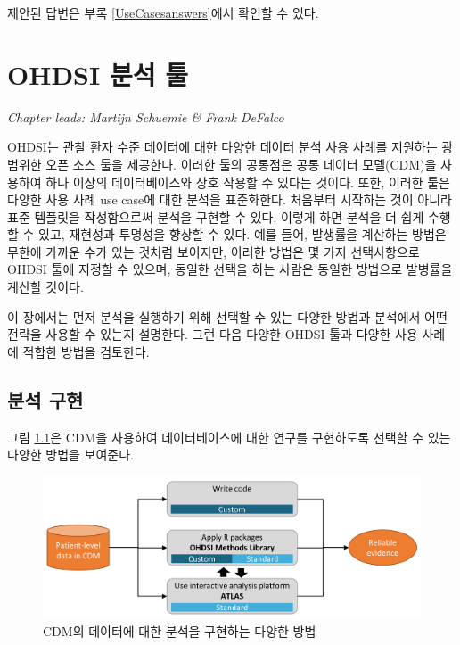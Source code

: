 \documentclass[10.5pt]{book}
\theoremstyle{definition}
\theoremstyle{definition}
\theoremstyle{definition}
\theoremstyle{remark}
\begin{document}
제안된 답변은 부록 \ref{UseCasesanswers}에서 확인할 수 있다.

\chapter{OHDSI 분석 툴}\label{OhdsiAnalyticsTools}

\emph{Chapter leads: Martijn Schuemie \& Frank DeFalco}

OHDSI는 관찰 환자 수준 데이터에 대한 다양한 데이터 분석 사용 사례를
지원하는 광범위한 오픈 소스 툴을 제공한다. 이러한 툴의 공통점은 공통
데이터 모델(CDM)을 사용하여 하나 이상의 데이터베이스와 상호 작용할 수
있다는 것이다. 또한, 이러한 툴은 다양한 사용 사례 use case에 대한 분석을
표준화한다. 처음부터 시작하는 것이 아니라 표준 템플릿을 작성함으로써
분석을 구현할 수 있다. 이렇게 하면 분석을 더 쉽게 수행할 수 있고,
재현성과 투명성을 향상할 수 있다. 예를 들어, 발생률을 계산하는 방법은
무한에 가까운 수가 있는 것처럼 보이지만, 이러한 방법은 몇 가지
선택사항으로 OHDSI 툴에 지정할 수 있으며, 동일한 선택을 하는 사람은
동일한 방법으로 발병률을 계산할 것이다.

이 장에서는 먼저 분석을 실행하기 위해 선택할 수 있는 다양한 방법과
분석에서 어떤 전략을 사용할 수 있는지 설명한다. 그런 다음 다양한 OHDSI
툴과 다양한 사용 사례에 적합한 방법을 검토한다.

\section{분석 구현}\label{analysisImplementation}

그림 \ref{fig:implementations}은 CDM을 사용하여 데이터베이스에 대한
연구를 구현하도록 선택할 수 있는 다양한 방법을 보여준다.

\begin{figure}

{\centering \includegraphics[width=0.9\linewidth]{images/OhdsiAnalyticsTools/implementations} 

}

\caption{CDM의 데이터에 대한 분석을 구현하는 다양한 방법}\label{fig:implementations}
\end{figure}
\end{document}
